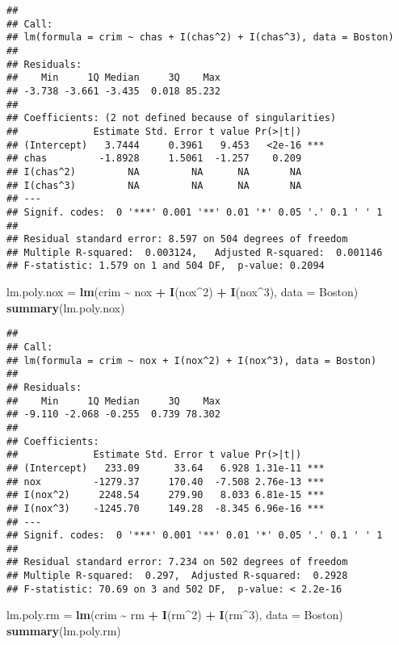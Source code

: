 \documentclass[
]{article}
\newenvironment{Shaded}{\begin{snugshade}}{\end{snugshade}}
\newcommand{\AttributeTok}[1]{\textcolor[rgb]{0.13,0.29,0.53}{#1}}
\newcommand{\DecValTok}[1]{\textcolor[rgb]{0.00,0.00,0.81}{#1}}
\newcommand{\FunctionTok}[1]{\textcolor[rgb]{0.13,0.29,0.53}{\textbf{#1}}}
\newcommand{\NormalTok}[1]{#1}
\newcommand{\OtherTok}[1]{\textcolor[rgb]{0.56,0.35,0.01}{#1}}
\newcommand{\SpecialCharTok}[1]{\textcolor[rgb]{0.81,0.36,0.00}{\textbf{#1}}}
\begin{document}
\begin{verbatim}
## 
## Call:
## lm(formula = crim ~ chas + I(chas^2) + I(chas^3), data = Boston)
## 
## Residuals:
##    Min     1Q Median     3Q    Max 
## -3.738 -3.661 -3.435  0.018 85.232 
## 
## Coefficients: (2 not defined because of singularities)
##             Estimate Std. Error t value Pr(>|t|)    
## (Intercept)   3.7444     0.3961   9.453   <2e-16 ***
## chas         -1.8928     1.5061  -1.257    0.209    
## I(chas^2)         NA         NA      NA       NA    
## I(chas^3)         NA         NA      NA       NA    
## ---
## Signif. codes:  0 '***' 0.001 '**' 0.01 '*' 0.05 '.' 0.1 ' ' 1
## 
## Residual standard error: 8.597 on 504 degrees of freedom
## Multiple R-squared:  0.003124,   Adjusted R-squared:  0.001146 
## F-statistic: 1.579 on 1 and 504 DF,  p-value: 0.2094
\end{verbatim}

\begin{Shaded}
\begin{Highlighting}[]
\NormalTok{lm.poly.nox }\OtherTok{=} \FunctionTok{lm}\NormalTok{(crim }\SpecialCharTok{\textasciitilde{}}\NormalTok{ nox }\SpecialCharTok{+} \FunctionTok{I}\NormalTok{(nox}\SpecialCharTok{\^{}}\DecValTok{2}\NormalTok{) }\SpecialCharTok{+} \FunctionTok{I}\NormalTok{(nox}\SpecialCharTok{\^{}}\DecValTok{3}\NormalTok{), }\AttributeTok{data =}\NormalTok{ Boston)}
\FunctionTok{summary}\NormalTok{(lm.poly.nox)}
\end{Highlighting}
\end{Shaded}

\begin{verbatim}
## 
## Call:
## lm(formula = crim ~ nox + I(nox^2) + I(nox^3), data = Boston)
## 
## Residuals:
##    Min     1Q Median     3Q    Max 
## -9.110 -2.068 -0.255  0.739 78.302 
## 
## Coefficients:
##             Estimate Std. Error t value Pr(>|t|)    
## (Intercept)   233.09      33.64   6.928 1.31e-11 ***
## nox         -1279.37     170.40  -7.508 2.76e-13 ***
## I(nox^2)     2248.54     279.90   8.033 6.81e-15 ***
## I(nox^3)    -1245.70     149.28  -8.345 6.96e-16 ***
## ---
## Signif. codes:  0 '***' 0.001 '**' 0.01 '*' 0.05 '.' 0.1 ' ' 1
## 
## Residual standard error: 7.234 on 502 degrees of freedom
## Multiple R-squared:  0.297,  Adjusted R-squared:  0.2928 
## F-statistic: 70.69 on 3 and 502 DF,  p-value: < 2.2e-16
\end{verbatim}

\begin{Shaded}
\begin{Highlighting}[]
\NormalTok{lm.poly.rm }\OtherTok{=} \FunctionTok{lm}\NormalTok{(crim }\SpecialCharTok{\textasciitilde{}}\NormalTok{ rm }\SpecialCharTok{+} \FunctionTok{I}\NormalTok{(rm}\SpecialCharTok{\^{}}\DecValTok{2}\NormalTok{) }\SpecialCharTok{+} \FunctionTok{I}\NormalTok{(rm}\SpecialCharTok{\^{}}\DecValTok{3}\NormalTok{), }\AttributeTok{data =}\NormalTok{ Boston)}
\FunctionTok{summary}\NormalTok{(lm.poly.rm)}
\end{Highlighting}
\end{Shaded}
\end{document}

